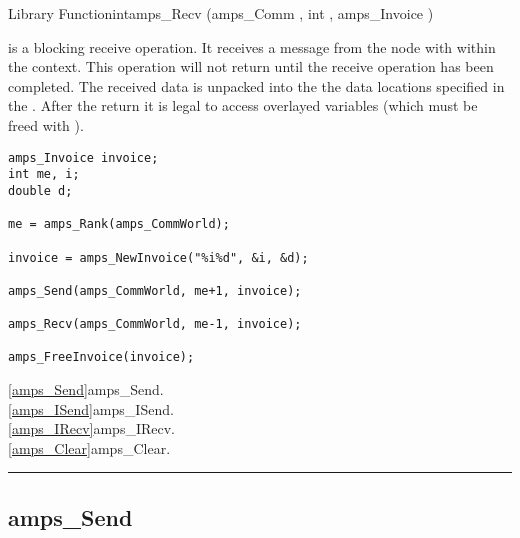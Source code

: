 \begin{deftypefn}{Library Function}{int}{amps\_Recv}
(amps_Comm , int , amps_Invoice )

\DESCRIPTION

 is a blocking receive operation.  It receives a message
from the node with  within the  context.  This
operation will not return until the receive operation has been
completed.  The received data is unpacked into the the data locations
specified in the .  After the return it is legal to access
overlayed variables (which must be freed with ).

\EXAMPLE

\begin{display}\begin{verbatim}
amps_Invoice invoice;
int me, i;
double d;

me = amps_Rank(amps_CommWorld);

invoice = amps_NewInvoice("%i%d", &i, &d);

amps_Send(amps_CommWorld, me+1, invoice);

amps_Recv(amps_CommWorld, me-1, invoice);

amps_FreeInvoice(invoice);
\end{verbatim}\end{display}

\SEEALSO
\vref{amps_Send}{amps\_Send}. \\
\vref{amps_ISend}{amps\_ISend}. \\
\vref{amps_IRecv}{amps\_IRecv}. \\
\vref{amps_Clear}{amps\_Clear}. \\

\end{deftypefn}


\noindent\rule{\textwidth}{1mm}

\subsection{amps\_Send}
\label{amps_Send}

